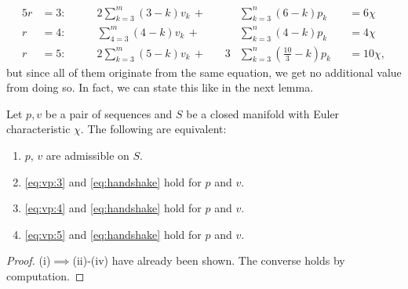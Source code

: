 \begin{alignat}{5}
  r &= 3: \qquad &2 \sum_{k=3}^m \left(3 - k \right) v_k\,+\, &&  & \sum_{k=3}^n \left(6 - k \right) p_k &&= 6 \chi \label{eq:vp:3}\\
  r &= 4: \qquad &  \sum_{4=3}^m \left(4 - k \right) v_k\,+\, &&  & \sum_{k=3}^n \left(4 - k \right) p_k &&= 4 \chi  \label{eq:vp:4}\\
  r &= 5: \qquad &2 \sum_{k=3}^m \left(5 - k \right) v_k\,+\, &&3 & \sum_{k=3}^n \left( \tfrac{10}{3} - k \right) p_k &&= 10 \chi, \label{eq:vp:5}
\end{alignat}
but since all of them originate from the same equation, we get no additional value from doing so. In fact, we can state this like in the next lemma.
\begin{lemma}
  Let $p, v$ be a pair of sequences and $S$ be a closed manifold with {\sc Euler} characteristic $\chi$. The following are equivalent:
  \begin{enumerate}[label=(\roman*)]
    \item $p$, $v$ are admissible on $S$.
    \item \eqref{eq:vp:3} and \eqref{eq:handshake} hold for $p$ and $v$.
    \item \eqref{eq:vp:4} and \eqref{eq:handshake} hold for $p$ and $v$.
    \item \eqref{eq:vp:5} and \eqref{eq:handshake} hold for $p$ and $v$.
  \end{enumerate}
  \begin{proof} (i)$\implies$(ii)-(iv) have already been shown. The converse holds by computation.
  \end{proof}
\end{lemma}

